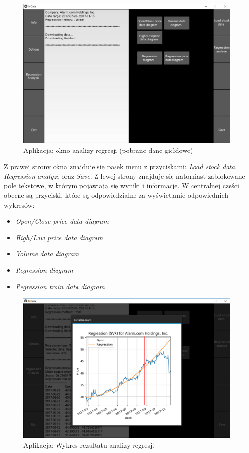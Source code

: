 \begin{figure}[ht]
\centering
\includegraphics[scale=0.4]{pictures/app_reg_screen_data_loaded.png}
\caption{Aplikacja: okno analizy regresji (pobrane dane giełdowe)}
\label{fig:app_okno_reg}
\end{figure}

Z prawej strony okna znajduje się pasek menu z przyciskami: \textit{Load stock data}, \textit{Regression analyze} oraz \textit{Save}.
Z lewej strony znajduje się natomiast zablokowane pole tekstowe, w którym pojawiają się wyniki i informacje.
W centralnej części obecne są przyciski, które są odpowiedzialne za wyświetlanie odpowiednich wykresów:
\begin{itemize}
 \item \textit{Open/Close price data diagram}
 \item \textit{High/Low price data diagram}
 \item \textit{Volume data diagram}
 \item \textit{Regression diagram}
 \item \textit{Regression train data diagram}
\end{itemize}

\begin{figure}[ht]
\centering
\includegraphics[scale=0.4]{pictures/app_reg_screen_plot.png}
\caption{Aplikacja: Wykres rezultatu analizy regresji}
\label{fig:app_regresja}
\end{figure}


